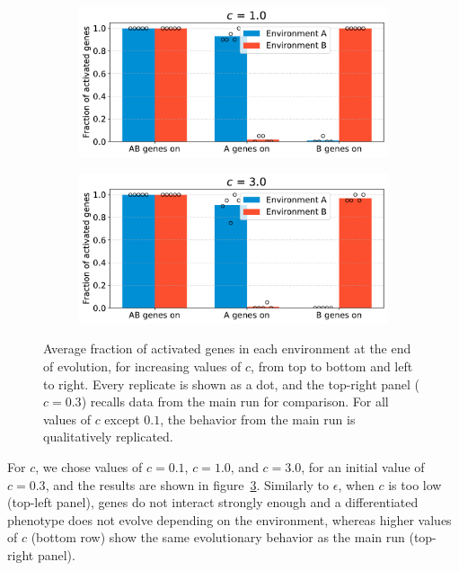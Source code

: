 \begin{figure}[H]
  \begin{subfigure}[t]{0.49\textwidth}
    \includegraphics[width=\textwidth]{alife/img/mean_activation_inter-coef-1.0.pdf}
    \label{subfig:alife:param_c_3}
  \end{subfigure}
  \begin{subfigure}[t]{0.49\textwidth}
    \includegraphics[width=\textwidth]{alife/img/mean_activation_inter-coef-3.0.pdf}
    \label{subfig:alife:param_c_4}
  \end{subfigure}
  \caption[Parameter exploration in the simple model: varying $c$]{Average fraction of activated genes in each environment at the end of evolution, for increasing values of $c$, from top to bottom and left to right.
  Every replicate is shown as a dot, and the top-right panel ($c = 0.3$) recalls data from the main run for comparison.
  For all values of $c$ except $0.1$, the behavior from the main run is qualitatively replicated.}
  \label{fig:alife:param_c}
\end{figure}

For $c$, we chose values of $c = 0.1$, $c = 1.0$, and $c = 3.0$, for an initial value of $c = 0.3$, and the results are shown in figure~\ref{fig:alife:param_c}.
Similarly to $\epsilon$, when $c$ is too low (top-left panel), genes do not interact strongly enough and a differentiated phenotype does not evolve depending on the environment, whereas higher values of $c$ (bottom row) show the same evolutionary behavior as the main run (top-right panel).

